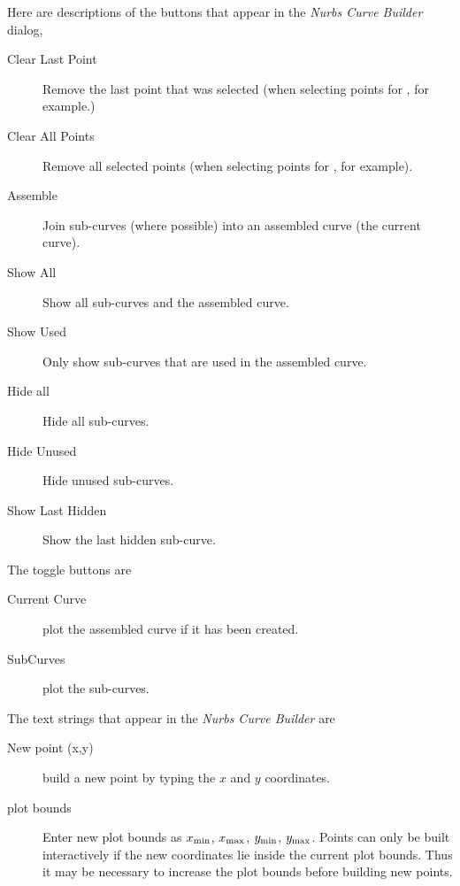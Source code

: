 Here are descriptions of the buttons that appear in the {\em Nurbs Curve Builder} 
dialog,
\begin{description}
  \item[Clear Last Point] Remove the last point that was selected (when selecting points for ,
      for example.)
  \item[Clear All Points] Remove all selected points (when selecting points for ,
      for example).
  \item[Assemble] Join sub-curves (where possible) into an assembled curve (the current curve).
  \item[Show All] Show all sub-curves and the assembled curve.
  \item[Show Used] Only show sub-curves that are used in the assembled curve.
  \item[Hide all] Hide all sub-curves.
  \item[Hide Unused] Hide unused sub-curves.
  \item[Show Last Hidden] Show the last hidden sub-curve.
\end{description}

The toggle buttons are
\begin{description}
  \item[Current Curve] plot the assembled curve if it has been created.
  \item[SubCurves] plot the sub-curves.
\end{description}

The text strings that appear in the {\em Nurbs Curve Builder} are
\begin{description}
  \item[New point (x,y)] build a new point by typing the $x$ and $y$ coordinates.
  \item[plot bounds] Enter new plot bounds as $x_{\rm min}$, $x_{\rm max}$, $y_{\rm min}$, $y_{\rm max}$.
     Points can only be built interactively if the new coordinates lie inside the current plot bounds.
     Thus it may be necessary to increase the plot bounds before building new points.
\end{description}

% 
